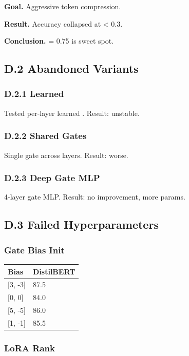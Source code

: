 \textbf{Goal.} Aggressive token compression.

\textbf{Result.} Accuracy collapsed at   < 0.3.

\textbf{Conclusion.}   = 0.75 is sweet spot.

\subsection{D.2 Abandoned Variants}

\subsubsection{D.2.1 Learned}

Tested per-layer learned  . Result: unstable.

\subsubsection{D.2.2 Shared Gates}

Single gate across layers. Result: worse.

\subsubsection{D.2.3 Deep Gate MLP}

4-layer gate MLP. Result: no improvement, more params.

\subsection{D.3 Failed Hyperparameters}

\subsubsection{Gate Bias Init}

\begin{table}[H]
\centering
\small
\begin{tabular}{ll}
\toprule
\textbf{Bias} & \textbf{DistilBERT} \\
\midrule
{[3, -3]} & 87.5 \\
{[0, 0]} & 84.0 \\
{[5, -5]} & 86.0 \\
{[1, -1]} & 85.5 \\
\bottomrule
\end{tabular}
\end{table}

\subsubsection{LoRA Rank}


